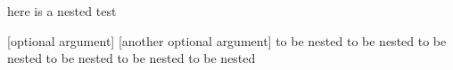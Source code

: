 here is a nested test
\begin{one}

	[optional argument]
	[another optional argument]
	to be nested to be nested
	to be nested to be nested
	to be nested to be nested
\end{one}
